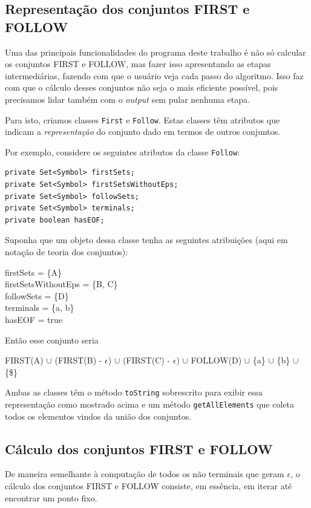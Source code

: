 \documentclass[11pt]{article}
\begin{document}
\subsection{Representação dos conjuntos FIRST e FOLLOW}
\label{sec:orgheadline7}
Uma das principais funcionalidades do programa deste trabalho é não só calcular
os conjuntos FIRST e FOLLOW, mas fazer isso apresentando as etapas
intermediárias, fazendo com que o usuário veja cada passo do algoritmo. Isso faz
com que o cálculo desses conjuntos não seja o mais eficiente possível, pois
precisamos lidar também com o \emph{output} sem pular nenhuma etapa.

Para isto, criamos classes \texttt{First} e \texttt{Follow}. Estas classes têm atributos que
indicam a \emph{representação} do conjunto dado em termos de outros conjuntos.

Por exemplo, considere os seguintes atributos da classe \texttt{Follow}:

\begin{verbatim}
private Set<Symbol> firstSets;
private Set<Symbol> firstSetsWithoutEps;
private Set<Symbol> followSets;
private Set<Symbol> terminals;
private boolean hasEOF;
\end{verbatim}

Suponha que um objeto dessa classe tenha as seguintes atribuições (aqui em
notação de teoria dos conjuntos):

\begin{center}
firstSets = \{A\} \\
firstSetsWithoutEps = \{B, C\} \\
followSets = \{D\} \\
terminals = \{a, b\} \\
hasEOF = true \\
\end{center}

Então esse conjunto seria

\begin{center}
FIRST(A) \(\cup\) (FIRST(B) - \(\epsilon\)) \(\cup\) (FIRST(C) - \(\epsilon\)) \(\cup\) FOLLOW(D)
\(\cup\) \{a\} \(\cup\) \{b\} \(\cup\) \{\$\}
\end{center}

Ambas as classes têm o método \texttt{toString} sobrescrito para exibir essa
representação como mostrado acima e um método \texttt{getAllElements} que coleta
todos os elementos vindos da união dos conjuntos.

\subsection{Cálculo dos conjuntos FIRST e FOLLOW}
\label{sec:orgheadline8}
De maneira semelhante à computação de todos os não terminais que geram \(\epsilon\),
o cálculo dos conjuntos FIRST e FOLLOW consiste, em essência, em iterar até
encontrar um ponto fixo.
\end{document}
